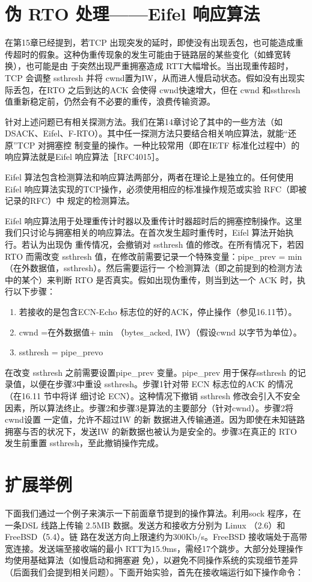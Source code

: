 \section{伪 RTO 处理——Eifel 响应算法}
在第15章已经提到，若TCP 出现突发的延时，即使没有出现丢包，也可能造成重传超时的假象。这种伪重传现象的发生可能由于链路层的某些变化（如蜂宽转换），也可能是由
于突然出现严重拥塞造成 RTT大幅增长。当出现重传超时，TCP 会调整 ssthresh 并将 cwnd置为IW，从而进人慢启动状态。假如没有出现实际丢包，在RTO 之后到达的ACK 会使得
cwnd快速增大，但在 cwnd 和ssthresh 值重新稳定前，仍然会有不必要的重传，浪费传输资源。

针对上述问题已有相关探测方法。我们在第14章讨论了其中的一些方法（如DSACK、Eifel、F-RTO）。其中任一探测方法只要结合相关响应算法，就能“还原”TCP 对拥塞控
制变量的操作。一种比较常用（即在IETF 标准化过程中）的响应算法就是Eifel 响应算法［RFC4015］。

Eifel 算法包含检测算法和响应算法两部分，两者在理论上是独立的。任何使用 Eifel 响应算法实现的TCP操作，必须使用相应的标准操作规范或实验 RFC（即被记录的RFC）中
规定的检测算法。

Eifel 响应算法用于处理重传计时器以及重传计时器超时后的拥塞控制操作。这里我们只讨论与拥塞相关的响应算法。在首次发生超时重传时，Eifel 算法开始执行。若认为出现伪
重传情况，会撤销对 ssthresh 值的修改。在所有情况下，若因 RTO 而需改变 ssthresh 值，在修改前需要记录一个特殊变量：pipe_prev = min（在外数据值，ssthresh）。然后需要运行一
个检测算法（即之前提到的检测方法中的某个）来判断 RTO 是否真实。假如出现伪重传，则当到达一个 ACK 时，执行以下步骤：

\begin{enumerate}
    \item 若接收的是包含ECN-Echo 标志位的好的ACK，停止操作（参见16.11节）。
    \item cwnd =在外数据值+ min （bytes_acked, IW）（假设cwnd 以字节为单位）。
    \item ssthresh = pipe_prevo
\end{enumerate}

在改变 ssthresh 之前需要设置pipe_prev 变量。pipe_prev 用于保存ssthresh 的记录值，以便在步骤3中重设 ssthresh。步骤1针对带 ECN 标志位的ACK 的情况（在16.11 节中将详
细讨论 ECN）。这种情况下撤销 ssthresh 修改会引入不安全因素，所以算法终止。步骤2和步骤3是算法的主要部分（针对cwnd）。步骤2将cwnd设置 一定值，允许不超过IW 的新
数据进入传输通道。因为即使在未知链路拥塞与否的状况下，发送IW 的新数据也被认为是安全的。步骤3在真正的 RTO 发生前重置 ssthresh，至此撤销操作完成。

\section{扩展举例}
下面我们通过一个例子来演示一下前面章节提到的操作算法。利用sock 程序，在一条DSL 线路上传输 2.5MB 数据。发送方和接收方分别为 Linux （2.6）和 FreeBSD（5.4）。链
路在发送方向上限速约为300Kb/s。FreeBSD 接收端处于高带宽连接。发送端至接收端的最小 RTT为15.9ms，需经17个跳步。大部分处理操作均使用基础算法（如慢启动和拥塞避
免），以避免不同操作系统的实现细节差异（后面我们会提到相关问题）。下面开始实验，首先在接收端运行如下操作命令：

